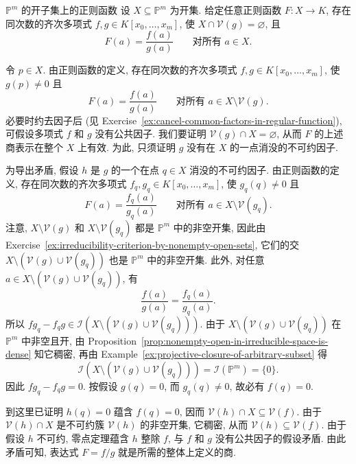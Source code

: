 \begin{Lemma}{$\mathbb{P}^{m}$ 的开子集上的正则函数}\leavevmode\label{lem:regular-functions-on-projective-open-subsets-are-global-quotients}
设 $X\subseteq\mathbb{P}^{m}$ 为开集. 给定任意正则函数 $F:X\to K$, 存在同次数的齐次多项式 $f,g\in K[x_{0},\ldots,x_{m}]$, 使 $X\cap\mathcal{V}(g)=\varnothing$, 且
\[
  F(a)=\frac{f(a)}{g(a)}\qquad\text{对所有 }a\in X.
\]
\end{Lemma}
\begin{Proof}
令 $p\in X$. 由正则函数的定义, 存在同次数的齐次多项式 $f,g\in K[x_{0},\ldots,x_{m}]$, 使 $g(p)\ne0$ 且
\[
  F(a)=\frac{f(a)}{g(a)}\qquad\text{对所有 }a\in X\setminus\mathcal{V}(g).
\]
必要时约去因子后 (见 Exercise~\ref{ex:cancel-common-factors-in-regular-function}), 可假设多项式 $f$ 和 $g$ 没有公共因子. 我们要证明 $\mathcal{V}(g)\cap X=\varnothing$, 从而 $F$ 的上述商表示在整个 $X$ 上有效. 为此, 只须证明 $g$ 没有在 $X$ 的一点消没的不可约因子.

为导出矛盾, 假设 $h$ 是 $g$ 的一个在点 $q\in X$ 消没的不可约因子. 由正则函数的定义, 存在同次数的齐次多项式 $f_{q},g_{q}\in K[x_{0},\ldots,x_{m}]$, 使 $g_{q}(q)\ne0$ 且
\[
  F(a)=\frac{f_{q}(a)}{g_{q}(a)}\qquad\text{对所有 }a\in X\setminus\mathcal{V}(g_{q}).
\]
注意, $X\setminus\mathcal{V}(g)$ 和 $X\setminus\mathcal{V}(g_{q})$ 都是 $\mathbb{P}^{m}$ 中的非空开集, 因此由 Exercise~\ref{ex:irreducibility-criterion-by-nonempty-open-sets}, 它们的交 $X\setminus(\mathcal{V}(g)\cup\mathcal{V}(g_{q}))$ 也是 $\mathbb{P}^{m}$ 中的非空开集. 此外, 对任意 $a\in X\setminus(\mathcal{V}(g)\cup\mathcal{V}(g_{q}))$, 有
\[
  \frac{f(a)}{g(a)}=\frac{f_{q}(a)}{g_{q}(a)}.
\]
所以 $fg_{q}-f_{q}g\in\mathcal{I}(X\setminus(\mathcal{V}(g)\cup\mathcal{V}(g_{q})))$. 由于 $X\setminus(\mathcal{V}(g)\cup\mathcal{V}(g_{q}))$ 在 $\mathbb{P}^{m}$ 中非空且开, 由 Proposition~\ref{prop:nonempty-open-in-irreducible-space-is-dense} 知它稠密, 再由 Example~\ref{ex:projective-closure-of-arbitrary-subset} 得
\[
  \mathcal{I}(X\setminus(\mathcal{V}(g)\cup\mathcal{V}(g_{q})))
    =\mathcal{I}(\mathbb{P}^{m})=\{0\}.
\]
因此 $fg_{q}-f_{q}g=0$. 按假设 $g(q)=0$, 而 $g_{q}(q)\ne0$, 故必有 $f(q)=0$.

到这里已证明 $h(q)=0$ 蕴含 $f(q)=0$, 因而 $\mathcal{V}(h)\cap X\subseteq\mathcal{V}(f)$. 由于 $\mathcal{V}(h)\cap X$ 是不可约簇 $\mathcal{V}(h)$ 的非空开集, 它稠密, 从而 $\mathcal{V}(h)\subseteq\mathcal{V}(f)$. 由于假设 $h$ 不可约, 零点定理蕴含 $h$ 整除 $f$, 与 $f$ 和 $g$ 没有公共因子的假设矛盾. 由此矛盾可知, 表达式 $F=f/g$ 就是所需的整体上定义的商.
\end{Proof}

